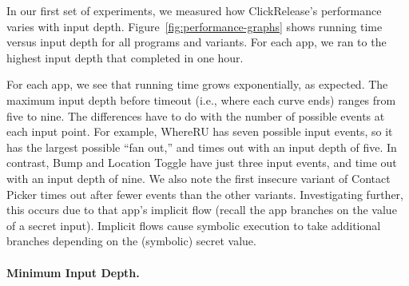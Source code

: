 \documentclass{llncs}
\newcommand{\toolname}{ClickRelease\xspace}
\begin{document}
In our first set of experiments, we measured how
\toolname{}'s performance varies with input
depth. Figure~\ref{fig:performance-graphs} shows running time 
versus input depth for all programs and variants.
For each app, we ran to the highest input depth that completed in
one hour.

For each app, we see that running time
grows exponentially, as expected. The maximum input depth
before timeout (i.e., where each curve ends) ranges from five to
nine. The differences have to do with the number of possible events at
each input point. For example, WhereRU has seven possible input events, so
it has the largest possible ``fan out,'' and times out with an input
depth of five. In contrast, Bump and Location Toggle have just three
input events, and time out with an input depth of nine. We also note the first
insecure variant of Contact Picker times out after fewer events than
the other variants. Investigating further, this occurs due to
that app's implicit flow (recall the app branches on the value of a
secret input). Implicit flows cause symbolic execution to take
additional branches depending on the (symbolic) secret value.



\paragraph*{Minimum Input Depth.}
\end{document}
